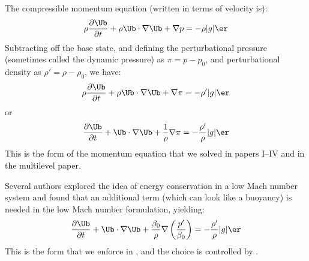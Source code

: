 The compressible momentum equation (written in terms of velocity is):
\begin{equation}
\rho \frac{\partial \Ub}{\partial t} + \rho \Ub \cdot \nabla \Ub + \nabla p = -\rho |g| \er
\end{equation}
Subtracting off the base state, and defining the perturbational
pressure (sometimes called the dynamic pressure) as $\pi = p - p_0$,
and perturbational density as $\rho' = \rho - \rho_0$, we have:
\begin{equation}
\rho \frac{\partial \Ub}{\partial t} + \rho \Ub \cdot \nabla \Ub + \nabla \pi = -\rho' |g| \er
\end{equation}
or
\begin{equation}
\frac{\partial \Ub}{\partial t} + \Ub \cdot \nabla \Ub + \frac{1}{\rho} \nabla \pi =
   -\frac{\rho^\prime}{\rho} |g| \er
\end{equation}
This is the form of the momentum equation that we solved in papers
I--IV and in the multilevel paper.

Several authors \cite{KP:2012,VLBWZ:2013} explored the idea of energy
conservation in a low Mach number system and found that an additional
term (which can look like a buoyancy) is needed in the low Mach number
formulation, yielding:
\begin{equation}
\frac{\partial \Ub}{\partial t} + \Ub \cdot \nabla \Ub +
   \frac{\beta_0}{\rho} \nabla \left (\frac{p^\prime}{\beta_0} \right ) =
   -\frac{\rho^\prime}{\rho} |g| \er
\end{equation}
This is the form that we enforce in \maestro, and the choice is controlled
by .

